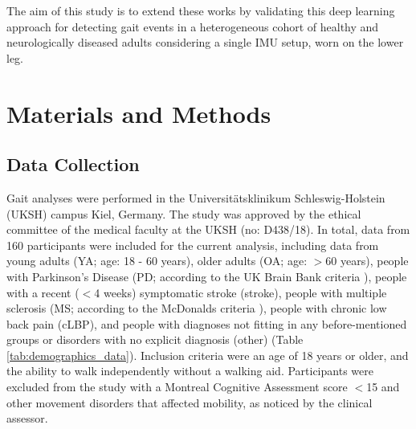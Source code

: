 \documentclass[sensors,article,submit,pdftex,moreauthors]{Definitions/mdpi}
\begin{document}
The aim of this study is to extend these works by validating this deep learning approach for detecting gait events in a heterogeneous cohort of healthy and neurologically diseased adults considering a single IMU setup, worn on the lower leg.
\section{Materials and Methods}
\subsection{Data Collection}
Gait analyses were performed in the Universit\"{a}tsklinikum Schleswig-Holstein (UKSH) campus Kiel, Germany. The study \cite{Warmerdam2021} was approved by the ethical committee of the medical faculty at the UKSH (no: D438/18). In total, data from 160 participants were included for the current analysis, including data from young adults (YA; age: 18 - 60 years), older adults (OA; age: $>$60 years), people with Parkinson's Disease (PD; according to the UK Brain Bank criteria \cite{Gibb1988}), people with a recent ($<$4 weeks) symptomatic stroke (stroke), people with multiple sclerosis (MS; according to the McDonalds criteria \cite{Thompson2018}), people with chronic low back pain (cLBP), and people with diagnoses not fitting in any before-mentioned groups or disorders with no explicit diagnosis (other) (Table \ref{tab:demographics_data}). Inclusion criteria were an age of 18 years or older, and the ability to walk independently without a walking aid. Participants were excluded from the study with a Montreal Cognitive Assessment \cite{Nasreddine2005} score $<$15 and other movement disorders that affected mobility, as noticed by the clinical assessor.
\end{document}
